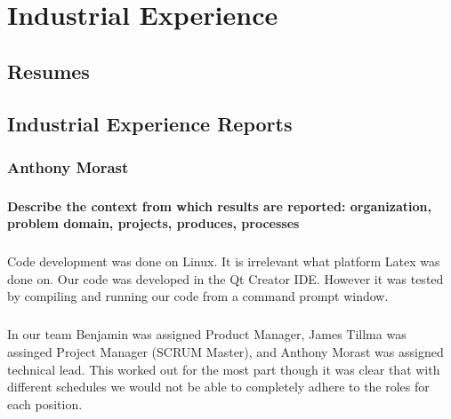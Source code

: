 
\chapter{Industrial Experience}

\section{Resumes}


%     
%     
%     

\section{Industrial Experience Reports}

\subsection{Anthony Morast}


\subsection{}

\subsubsection{Describe the context from which results are reported: organization, problem domain, projects, produces, processes}
\paragraph{} Code development was done on Linux. It is irrelevant what platform Latex was done on. Our code was developed in the Qt Creator IDE. However it was tested by compiling and running our code from a command prompt window.

\paragraph{}
In our team Benjamin was assigned Product Manager, James Tillma was assinged Project Manager (SCRUM Master), and Anthony Morast was assigned technical lead. This worked out for the most part though it was clear that with different schedules we would not be able to completely adhere to the roles for each position. 

